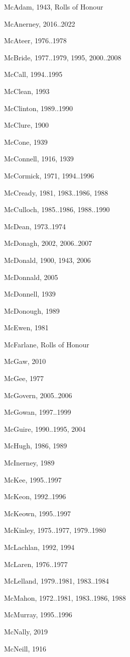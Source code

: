 {\begin{theindex}
\item McAdam, 1943, Rolls of Honour
\item McAnerney, 2016..2022
\item McAteer, 1976..1978
\item McBride, 1977..1979, 1995, 2000..2008
\item McCall, 1994..1995
\item McClean, 1993
\item McClinton, 1989..1990
\item McClure, 1900
\item McCone, 1939
\item McConnell, 1916, 1939
\item McCormick, 1971, 1994..1996
\item McCready, 1981, 1983..1986, 1988
\item McCulloch, 1985..1986, 1988..1990
\item McDean, 1973..1974
\item McDonagh, 2002, 2006..2007
\item McDonald, 1900, 1943, 2006
\item McDonnald, 2005
\item McDonnell, 1939
\item McDonough, 1989
\item McEwen, 1981
\item McFarlane, Rolls of Honour
\item McGaw, 2010
\item McGee, 1977
\item McGovern, 2005..2006
\item McGowan, 1997..1999
\item McGuire, 1990..1995, 2004
\item McHugh, 1986, 1989
\item McInerney, 1989
\item McKee, 1995..1997
\item McKeon, 1992..1996
\item McKeown, 1995..1997
\item McKinley, 1975..1977, 1979..1980
\item McLachlan, 1992, 1994
\item McLaren, 1976..1977
\item McLelland, 1979..1981, 1983..1984
\item McMahon, 1972..1981, 1983..1986, 1988
\item McMurray, 1995..1996
\item McNally, 2019
\item McNeill, 1916

\end{theindex}}
